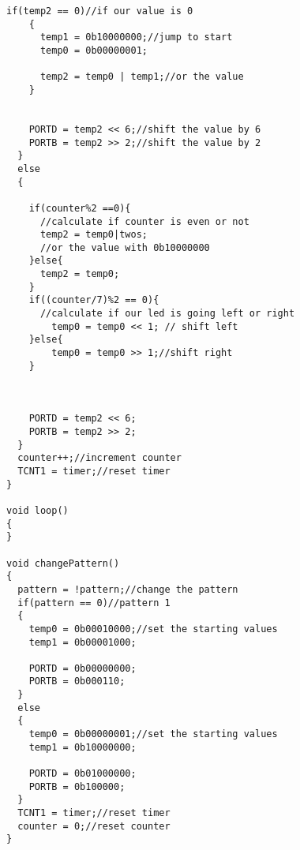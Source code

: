 \documentclass[pdftex,12pt,a4paper]{article}
\begin{document}
\begin{flushleft}
\begin{lstlisting}[style={Arduino}]
    if(temp2 == 0)//if our value is 0
    {
      temp1 = 0b10000000;//jump to start
      temp0 = 0b00000001;
      
      temp2 = temp0 | temp1;//or the value
    }
    

    PORTD = temp2 << 6;//shift the value by 6
    PORTB = temp2 >> 2;//shift the value by 2
  }
  else
  {
  
    if(counter%2 ==0){
      //calculate if counter is even or not
      temp2 = temp0|twos;
      //or the value with 0b10000000
    }else{
      temp2 = temp0;
    }
    if((counter/7)%2 == 0){
      //calculate if our led is going left or right
    	temp0 = temp0 << 1; // shift left
    }else{
    	temp0 = temp0 >> 1;//shift right
    }
    
    
    
    PORTD = temp2 << 6;
    PORTB = temp2 >> 2;
  }
  counter++;//increment counter
  TCNT1 = timer;//reset timer
}

void loop()
{
}

void changePattern()
{
  pattern = !pattern;//change the pattern
  if(pattern == 0)//pattern 1
  {
    temp0 = 0b00010000;//set the starting values
    temp1 = 0b00001000;
    
   	PORTD = 0b00000000;
  	PORTB = 0b000110;
  }
  else 
  {
  	temp0 = 0b00000001;//set the starting values
    temp1 = 0b10000000;
    
    PORTD = 0b01000000;
  	PORTB = 0b100000;
  }
  TCNT1 = timer;//reset timer
  counter = 0;//reset counter
}
\end{lstlisting}
\end{flushleft}
\end{document}

